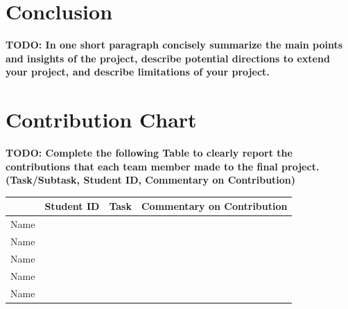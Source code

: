 \documentclass{article}
\theoremstyle{plain}
\theoremstyle{definition}
\theoremstyle{remark}
\begin{document}
\section{Conclusion}
\textbf{TODO: In one short paragraph concisely summarize the main points and insights of the project,
describe potential directions to extend your project, and describe limitations of your project.}

\section{Contribution Chart}
\textbf{TODO: Complete the following Table to clearly report the contributions that each team
member made to the final project. (Task/Subtask, Student ID, Commentary on Contribution)}

\begin{table}[!h]
    \centering
    \begin{tabular}{| c || c | c | c |}
        \hline
        & Student ID & Task & Commentary on Contribution \\
        \hline
        Name & & & \\
        \hline
        Name & & & \\
        \hline
        Name & & & \\
        \hline
        Name & & & \\
        \hline
        Name & & & \\
        \hline
    \end{tabular}
\end{table}
\end{document}

